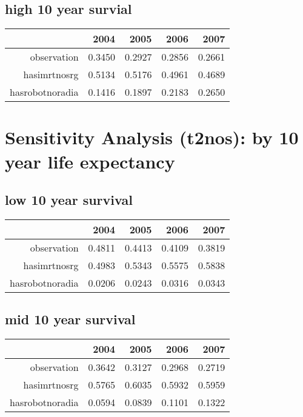 \documentclass[12pt]{report}
\begin{document}
\subsection{high 10 year survial}
\begin{table}[ht]
\begin{center}
\begin{tabular}{rrrrr}
  \hline
 & 2004 & 2005 & 2006 & 2007 \\ 
  \hline
observation & 0.3450 & 0.2927 & 0.2856 & 0.2661 \\ 
  hasimrtnosrg & 0.5134 & 0.5176 & 0.4961 & 0.4689 \\ 
  hasrobotnoradia & 0.1416 & 0.1897 & 0.2183 & 0.2650 \\ 
   \hline
\end{tabular}
\end{center}
\end{table}
\pagebreak


\section{Sensitivity Analysis (t2nos): by 10 year life expectancy}
\subsection{low 10 year survival}
\begin{table}[ht]
\begin{center}
\begin{tabular}{rrrrr}
  \hline
 & 2004 & 2005 & 2006 & 2007 \\ 
  \hline
observation & 0.4811 & 0.4413 & 0.4109 & 0.3819 \\ 
  hasimrtnosrg & 0.4983 & 0.5343 & 0.5575 & 0.5838 \\ 
  hasrobotnoradia & 0.0206 & 0.0243 & 0.0316 & 0.0343 \\ 
   \hline
\end{tabular}
\end{center}
\end{table}
\subsection{mid 10 year survival}
\begin{table}[ht]
\begin{center}
\begin{tabular}{rrrrr}
  \hline
 & 2004 & 2005 & 2006 & 2007 \\ 
  \hline
observation & 0.3642 & 0.3127 & 0.2968 & 0.2719 \\ 
  hasimrtnosrg & 0.5765 & 0.6035 & 0.5932 & 0.5959 \\ 
  hasrobotnoradia & 0.0594 & 0.0839 & 0.1101 & 0.1322 \\ 
   \hline
\end{tabular}
\end{center}
\end{table}
\end{document}
